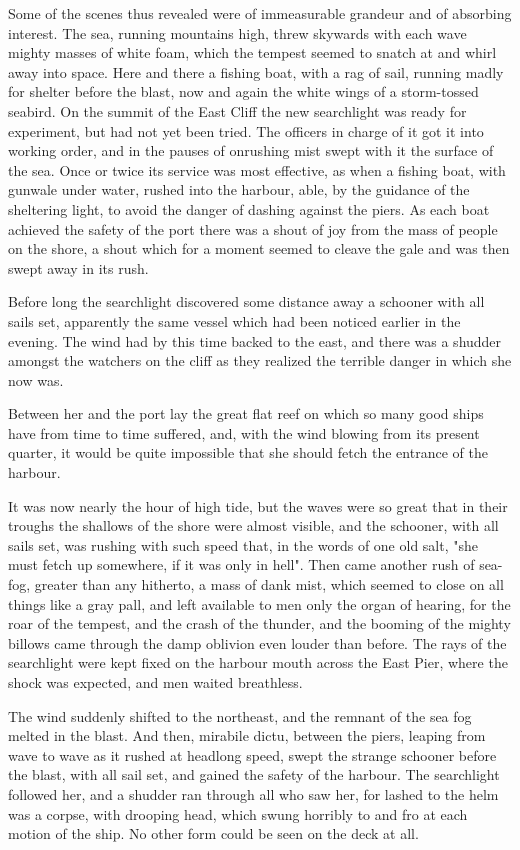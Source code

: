 Some of the scenes thus revealed were of immeasurable grandeur and of absorbing interest. The sea, running mountains high, threw skywards with each wave mighty masses of white foam, which the tempest seemed to snatch at and whirl away into space. Here and there a fishing boat, with a rag of sail, running madly for shelter before the blast, now and again the white wings of a storm-tossed seabird. On the summit of the East Cliff the new searchlight was ready for experiment, but had not yet been tried. The officers in charge of it got it into working order, and in the pauses of onrushing mist swept with it the surface of the sea. Once or twice its service was most effective, as when a fishing boat, with gunwale under water, rushed into the harbour, able, by the guidance of the sheltering light, to avoid the danger of dashing against the piers. As each boat achieved the safety of the port there was a shout of joy from the mass of people on the shore, a shout which for a moment seemed to cleave the gale and was then swept away in its rush. 

Before long the searchlight discovered some distance away a schooner with all sails set, apparently the same vessel which had been noticed earlier in the evening. The wind had by this time backed to the east, and there was a shudder amongst the watchers on the cliff as they realized the terrible danger in which she now was. 

Between her and the port lay the great flat reef on which so many good ships have from time to time suffered, and, with the wind blowing from its present quarter, it would be quite impossible that she should fetch the entrance of the harbour. 

It was now nearly the hour of high tide, but the waves were so great that in their troughs the shallows of the shore were almost visible, and the schooner, with all sails set, was rushing with such speed that, in the words of one old salt, "she must fetch up somewhere, if it was only in hell". Then came another rush of sea-fog, greater than any hitherto, a mass of dank mist, which seemed to close on all things like a gray pall, and left available to men only the organ of hearing, for the roar of the tempest, and the crash of the thunder, and the booming of the mighty billows came through the damp oblivion even louder than before. The rays of the searchlight were kept fixed on the harbour mouth across the East Pier, where the shock was expected, and men waited breathless. 

The wind suddenly shifted to the northeast, and the remnant of the sea fog melted in the blast. And then, mirabile dictu, between the piers, leaping from wave to wave as it rushed at headlong speed, swept the strange schooner before the blast, with all sail set, and gained the safety of the harbour. The searchlight followed her, and a shudder ran through all who saw her, for lashed to the helm was a corpse, with drooping head, which swung horribly to and fro at each motion of the ship. No other form could be seen on the deck at all. 

